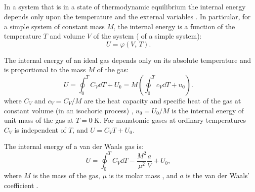 \subsection{}\label{9.1.4} In a system that is in a state of thermodynamic equilibrium the internal energy depends only upon the temperature and the external variables . In particular, for a simple system  of constant mass $M$, the internal energy is a func­tion of the temperature $T$ and volume $V$ of the system ( of a simple system):
\begin{equation*}%
U= \varphi (V, \,T).
\end{equation*}

\noindent{} The internal energy of an ideal gas  depends only on its absolute temperature and is proportional to the mass $M$ of the gas:
\begin{equation*}%
U = \oint_{0}^{T} C_{V} \dd T + U_{0}= M \left(\oint_{0}^{T} c_{V} \dd T + u_{0}\right).
\end{equation*}
where $C_{V}$ and $c_{V} = C_{V}/M$ are the heat capacity  and specific heat  of the gas at constant volume (in an isochoric process) , $u_{0} = U_{0}/M$ is the internal energy of unit mass of the gas at $T = \SI{0}{\kelvin}$. For monatomic gases at ordinary temperatures $C_{V}$ is independent of $T$, and $U = C_{V}T + U_{0}$. 

\noindent{} The internal energy of a van der Waals gas  is:
\begin{equation*}%
U = \oint_{0}^{T} C_{V} \dd T - \frac{M^{2}}{\mu^{2}} \frac{a}{V} + U_{0},
\end{equation*}
where $M$ is the mass of the gas, $\mu$ is its molar mass , and $a$ is the van der Waals' coefficient .

